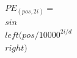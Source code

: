 \documentclass[preview]{standalone}
\begin{document}
\begin{align*}
PE_{(pos,2i)} = \\sin\\left( pos / 10000^{2i/d} \\right)
\end{align*}
\end{document}
